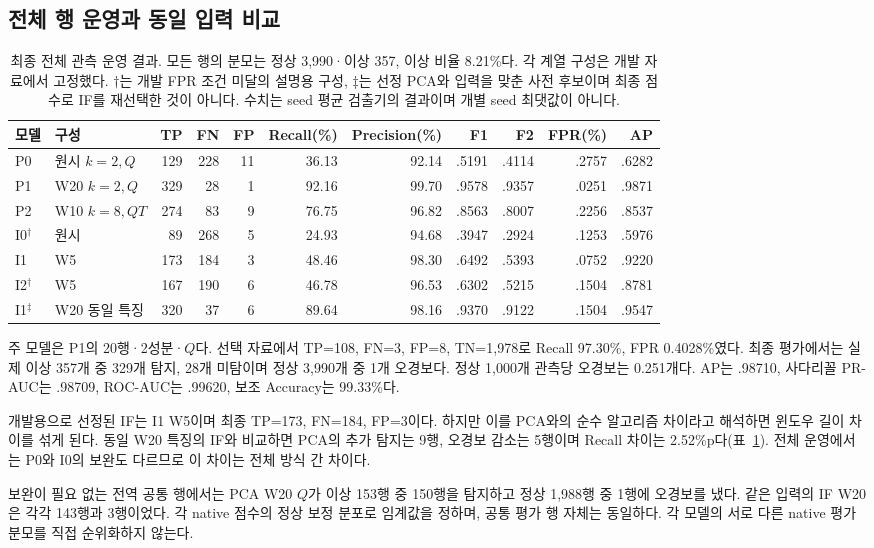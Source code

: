 \documentclass{article}
\begin{document}
\subsection{전체 행 운영과 동일 입력 비교}
\begin{table}[t]
\caption{최종 전체 관측 운영 결과. 모든 행의 분모는 정상 3,990·이상 357, 이상 비율 8.21\%다. 각 계열 구성은 개발 자료에서 고정했다. $\dagger$는 개발 FPR 조건 미달의 설명용 구성, $\ddagger$는 선정 PCA와 입력을 맞춘 사전 후보이며 최종 점수로 IF를 재선택한 것이 아니다. 수치는 seed 평균 검출기의 결과이며 개별 seed 최댓값이 아니다.}
\label{tab:main}\centering\small
\begin{tabular}{llrrrrrrrrr}\toprule
모델 & 구성 & TP & FN & FP & Recall(\%) & Precision(\%) & F1 & F2 & FPR(\%) & AP\\\midrule
P0 & 원시 $k=2,Q$ &129&228&11&36.13&92.14&.5191&.4114&.2757&.6282\\
P1 & W20 $k=2,Q$ &329&28&1&92.16&99.70&.9578&.9357&.0251&.9871\\
P2 & W10 $k=8,QT$ &274&83&9&76.75&96.82&.8563&.8007&.2256&.8537\\
I0$^\dagger$ & 원시 &89&268&5&24.93&94.68&.3947&.2924&.1253&.5976\\
I1 & W5 &173&184&3&48.46&98.30&.6492&.5393&.0752&.9220\\
I2$^\dagger$ & W5 &167&190&6&46.78&96.53&.6302&.5215&.1504&.8781\\
I1$^\ddagger$ & W20 동일 특징 &320&37&6&89.64&98.16&.9370&.9122&.1504&.9547\\\bottomrule
\end{tabular}
\end{table}

주 모델은 P1의 20행·2성분·$Q$다. 선택 자료에서 TP=108, FN=3, FP=8, TN=1,978로 Recall 97.30\%, FPR 0.4028\%였다. 최종 평가에서는 실제 이상 357개 중 329개 탐지, 28개 미탐이며 정상 3,990개 중 1개 오경보다. 정상 1,000개 관측당 오경보는 0.251개다. AP는 .98710, 사다리꼴 PR-AUC는 .98709, ROC-AUC는 .99620, 보조 Accuracy는 99.33\%다.

개발용으로 선정된 IF는 I1 W5이며 최종 TP=173, FN=184, FP=3이다. 하지만 이를 PCA와의 순수 알고리즘 차이라고 해석하면 윈도우 길이 차이를 섞게 된다. 동일 W20 특징의 IF와 비교하면 PCA의 추가 탐지는 9행, 오경보 감소는 5행이며 Recall 차이는 2.52\%p다(표~\ref{tab:main}). 전체 운영에서는 P0와 I0의 보완도 다르므로 이 차이는 전체 방식 간 차이다.

보완이 필요 없는 전역 공통 행에서는 PCA W20 $Q$가 이상 153행 중 150행을 탐지하고 정상 1,988행 중 1행에 오경보를 냈다. 같은 입력의 IF W20은 각각 143행과 3행이었다. 각 native 점수의 정상 보정 분포로 임계값을 정하며, 공통 평가 행 자체는 동일하다. 각 모델의 서로 다른 native 평가 분모를 직접 순위화하지 않는다.
\end{document}

